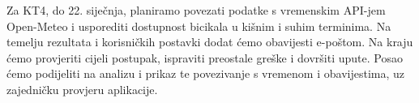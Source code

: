 \documentclass[a4paper,11pt]{article}
\begin{document}
Za KT4, do 22. siječnja, planiramo povezati podatke s vremenskim
API-jem Open-Meteo i usporediti dostupnost bicikala u kišnim i
suhim terminima. Na temelju rezultata i korisničkih postavki
dodat ćemo obavijesti e-poštom. Na kraju ćemo provjeriti cijeli
postupak, ispraviti preostale greške i dovršiti upute.
Posao ćemo podijeliti na analizu i prikaz te povezivanje s
vremenom i obavijestima, uz zajedničku provjeru aplikacije.
\end{document}
